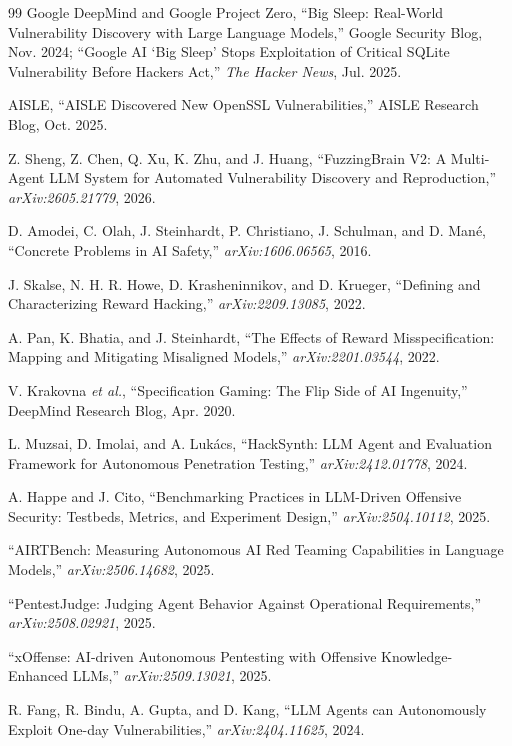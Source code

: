 \documentclass[10pt,twocolumn]{article}
\begin{document}
\begin{thebibliography}{99}
 Google DeepMind and Google Project Zero, ``Big
Sleep: Real-World Vulnerability Discovery with Large Language Models,''
Google Security Blog, Nov. 2024; ``Google AI `Big Sleep' Stops
Exploitation of Critical SQLite Vulnerability Before Hackers Act,''
\textit{The Hacker News}, Jul. 2025.

 AISLE, ``AISLE Discovered New OpenSSL
Vulnerabilities,'' AISLE Research Blog, Oct. 2025.

 Z. Sheng, Z. Chen, Q. Xu, K. Zhu, and J.
Huang, ``FuzzingBrain V2: A Multi-Agent LLM System for Automated
Vulnerability Discovery and Reproduction,'' \textit{arXiv:2605.21779},
2026.

 D. Amodei, C. Olah, J. Steinhardt, P.
Christiano, J. Schulman, and D. Man\'e, ``Concrete Problems in AI
Safety,'' \textit{arXiv:1606.06565}, 2016.

 J. Skalse, N. H. R. Howe, D. Krasheninnikov,
and D. Krueger, ``Defining and Characterizing Reward Hacking,''
\textit{arXiv:2209.13085}, 2022.

 A. Pan, K. Bhatia, and J. Steinhardt, ``The
Effects of Reward Misspecification: Mapping and Mitigating Misaligned
Models,'' \textit{arXiv:2201.03544}, 2022.

 V. Krakovna \textit{et al.},
``Specification Gaming: The Flip Side of AI Ingenuity,'' DeepMind
Research Blog, Apr. 2020.

 L. Muzsai, D. Imolai, and A. Luk\'acs,
``HackSynth: LLM Agent and Evaluation Framework for Autonomous
Penetration Testing,'' \textit{arXiv:2412.01778}, 2024.

 A. Happe and J. Cito, ``Benchmarking Practices
in LLM-Driven Offensive Security: Testbeds, Metrics, and Experiment
Design,'' \textit{arXiv:2504.10112}, 2025.

 ``AIRTBench: Measuring Autonomous AI Red
Teaming Capabilities in Language Models,'' \textit{arXiv:2506.14682}, 2025.

 ``PentestJudge: Judging Agent Behavior
Against Operational Requirements,'' \textit{arXiv:2508.02921}, 2025.

 ``xOffense: AI-driven Autonomous Pentesting with
Offensive Knowledge-Enhanced LLMs,'' \textit{arXiv:2509.13021}, 2025.

 R. Fang, R. Bindu, A. Gupta, and D. Kang,
``LLM Agents can Autonomously Exploit One-day Vulnerabilities,''
\textit{arXiv:2404.11625}, 2024.


\end{thebibliography}
\end{document}

